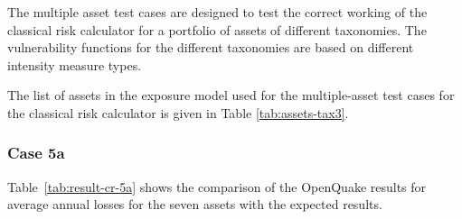 The multiple asset test cases are designed to test the correct working of the classical risk calculator for a portfolio of assets of different taxonomies. The vulnerability functions for the different taxonomies are based on different intensity measure types.

The list of assets in the exposure model used for the multiple-asset test cases for the classical risk calculator is given in Table \ref{tab:assets-tax3}.

\subsubsection{Case 5a}


Table~\ref{tab:result-cr-5a} shows the comparison of the OpenQuake results for average annual losses for the seven assets with the expected results.